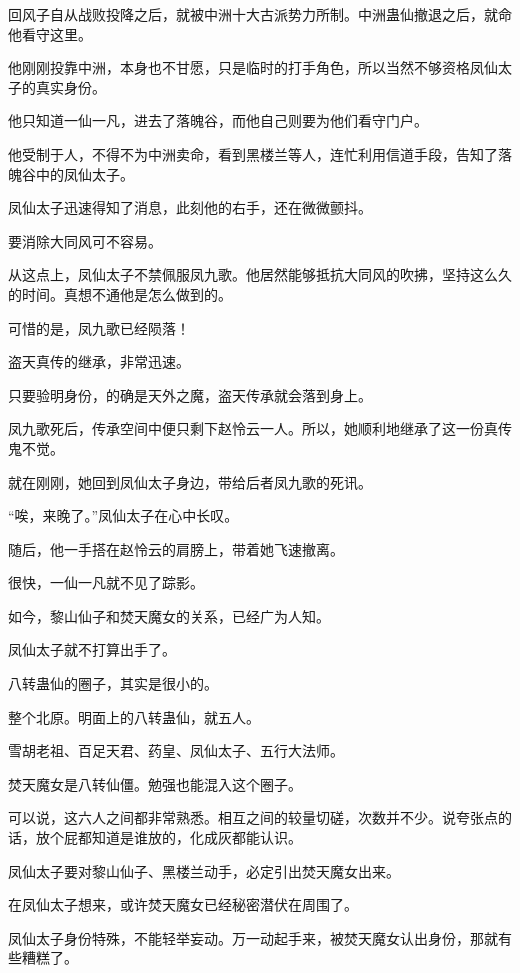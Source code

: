 
\begin{this_body}

回风子自从战败投降之后，就被中洲十大古派势力所制。中洲蛊仙撤退之后，就命他看守这里。

他刚刚投靠中洲，本身也不甘愿，只是临时的打手角色，所以当然不够资格凤仙太子的真实身份。

他只知道一仙一凡，进去了落魄谷，而他自己则要为他们看守门户。

他受制于人，不得不为中洲卖命，看到黑楼兰等人，连忙利用信道手段，告知了落魄谷中的凤仙太子。

凤仙太子迅速得知了消息，此刻他的右手，还在微微颤抖。

要消除大同风可不容易。

从这点上，凤仙太子不禁佩服凤九歌。他居然能够抵抗大同风的吹拂，坚持这么久的时间。真想不通他是怎么做到的。

可惜的是，凤九歌已经陨落！

盗天真传的继承，非常迅速。

只要验明身份，的确是天外之魔，盗天传承就会落到身上。

凤九歌死后，传承空间中便只剩下赵怜云一人。所以，她顺利地继承了这一份真传鬼不觉。

就在刚刚，她回到凤仙太子身边，带给后者凤九歌的死讯。

“唉，来晚了。”凤仙太子在心中长叹。

随后，他一手搭在赵怜云的肩膀上，带着她飞速撤离。

很快，一仙一凡就不见了踪影。

如今，黎山仙子和焚天魔女的关系，已经广为人知。

凤仙太子就不打算出手了。

八转蛊仙的圈子，其实是很小的。

整个北原。明面上的八转蛊仙，就五人。

雪胡老祖、百足天君、药皇、凤仙太子、五行大法师。

焚天魔女是八转仙僵。勉强也能混入这个圈子。

可以说，这六人之间都非常熟悉。相互之间的较量切磋，次数并不少。说夸张点的话，放个屁都知道是谁放的，化成灰都能认识。

凤仙太子要对黎山仙子、黑楼兰动手，必定引出焚天魔女出来。

在凤仙太子想来，或许焚天魔女已经秘密潜伏在周围了。

凤仙太子身份特殊，不能轻举妄动。万一动起手来，被焚天魔女认出身份，那就有些糟糕了。


\end{this_body}
